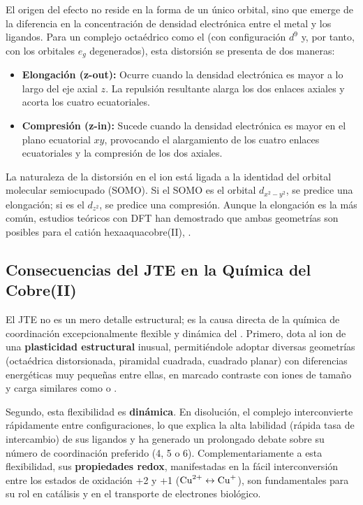 El origen del efecto no reside en la forma de un único orbital, sino que emerge de la diferencia en la concentración de densidad electrónica entre el metal y los ligandos. Para un complejo octaédrico como el  (con configuración $d^9$ y, por tanto, con los orbitales $e_g$ degenerados), esta distorsión se presenta de dos maneras:
\begin{itemize}
    \item \textbf{Elongación (z-out):} Ocurre cuando la densidad electrónica es mayor a lo largo del eje axial $z$. La repulsión resultante alarga los dos enlaces axiales y acorta los cuatro ecuatoriales.
    \item \textbf{Compresión (z-in):} Sucede cuando la densidad electrónica es mayor en el plano ecuatorial $xy$, provocando el alargamiento de los cuatro enlaces ecuatoriales y la compresión de los dos axiales.
\end{itemize}

La naturaleza de la distorsión en el ion  está ligada a la identidad del orbital molecular semiocupado (SOMO). Si el SOMO es el orbital $d_{x^2-y^2}$, se predice una elongación; si es el $d_{z^2}$, se predice una compresión. Aunque la elongación es la más común, estudios teóricos con DFT han demostrado que ambas geometrías son posibles para el catión hexaaquacobre(II), .

\subsection{Consecuencias del JTE en la Química del Cobre(II)}

El JTE no es un mero detalle estructural; es la causa directa de la química de coordinación excepcionalmente flexible y dinámica del . Primero, dota al ion de una \textbf{plasticidad estructural} inusual, permitiéndole adoptar diversas geometrías (octaédrica distorsionada, piramidal cuadrada, cuadrado planar) con diferencias energéticas muy pequeñas entre ellas, en marcado contraste con iones de tamaño y carga similares como  o .

Segundo, esta flexibilidad es \textbf{dinámica}. En disolución, el complejo interconvierte rápidamente entre configuraciones, lo que explica la alta labilidad (rápida tasa de intercambio) de sus ligandos y ha generado un prolongado debate sobre su número de coordinación preferido (4, 5 o 6). Complementariamente a esta flexibilidad, sus \textbf{propiedades redox}, manifestadas en la fácil interconversión entre los estados de oxidación +2 y +1 ($\ce{Cu^{2+}} \leftrightarrow \ce{Cu^+}$), son fundamentales para su rol en catálisis y en el transporte de electrones biológico.

